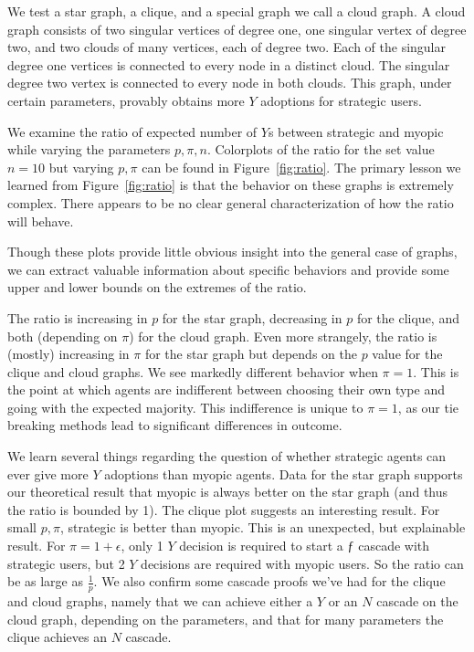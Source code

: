 \documentclass{article}
\begin{document}
We test a star graph, a clique, and a special graph we call a cloud graph. A cloud graph consists of two singular vertices of degree one, one singular vertex of degree two, and two clouds of many vertices, each of degree two. Each of the singular degree one vertices is connected to every node in a distinct cloud. The singular degree two vertex is connected to every node in both clouds. This graph, under certain parameters, provably obtains more $Y$ adoptions for strategic users.

We examine the ratio of expected number of $Y$s between strategic and myopic while varying the parameters $p, \pi, n$. Colorplots of the ratio for the set value $n=10$ but varying $p, \pi$ can be found in Figure~\ref{fig:ratio}. The primary lesson we learned from Figure~\ref{fig:ratio} is that the behavior on these graphs is extremely complex. There appears to be no clear general characterization of how the ratio will behave.

Though these plots provide little obvious insight into the general case of graphs, we can extract valuable information about specific behaviors and provide some upper and lower bounds on the extremes of the ratio.

The ratio is increasing in $p$ for the star graph, decreasing in $p$ for the clique, and both (depending on $\pi$) for the cloud graph. Even more strangely, the ratio is (mostly) increasing in $\pi$ for the star graph but depends on the $p$ value for the clique and cloud graphs. We see markedly different behavior when $\pi = 1$. This is the point at which agents are indifferent between choosing their own type and going with the expected majority. This indifference is unique to $\pi=1$, as our tie breaking methods lead to significant differences in outcome.

We learn several things regarding the question of whether strategic agents can ever give more $Y$ adoptions than myopic agents. Data for the star graph supports our theoretical result that myopic is always better on the star graph (and thus the ratio is bounded by 1). The clique plot suggests an interesting result. For small $p, \pi$, strategic is better than myopic. This is an unexpected, but explainable result. For $\pi=1+\epsilon$, only 1 $Y$ decision is required to start a $ƒ$ cascade with strategic users, but 2 $Y$ decisions are required with myopic users. So the ratio can be as large as $\frac{1}{p}$. We also confirm some cascade proofs we've had for the clique and cloud graphs, namely that we can achieve either a $Y$ or an $N$ cascade on the cloud graph, depending on the parameters, and that for many parameters the clique achieves an $N$ cascade.
\end{document}
